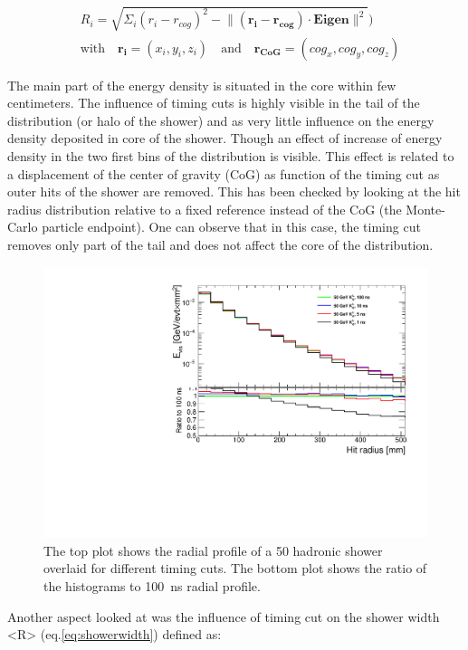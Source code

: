 \begin{equation} \label{eq:radialprof}
  \begin{split}
    & R_{i} = \sqrt{\Sigma_{i} (r_{i} - r_{cog})^{2} - \lVert (\mathbf{r_{i}} - \mathbf{r_{cog}}) \cdot \mathbf{Eigen} \rVert^{2}}) \\
    & \text{with} \quad \mathbf{r_{i}} = (x_i, y_i, z_i) \quad \text{and} \quad \mathbf{r_{CoG}} = (cog_x, cog_y, cog_z)
  \end{split}
\end{equation}

The main part of the energy density is situated in the core within few centimeters. The influence of timing cuts is highly visible in the tail of the distribution (or halo of the shower) and as very little influence on the energy density deposited in core of the shower. Though an effect of increase of energy density in the two first bins of the distribution is visible. This effect is related to a displacement of the center of gravity (CoG) as function of the timing cut as outer hits of the shower are removed. This has been checked by looking at the hit radius distribution relative to a fixed reference instead of the CoG (the Monte-Carlo particle endpoint). One can observe that in this case, the timing cut removes only part of the tail and does not affect the core of the distribution.

\begin{figure}[htbp!]
  \centering
  \includegraphics[width=0.7\linewidth]{../Thesis_Plots/ILD/NoSmearing/Plots/RadialProfileOverlay_noSmearing}
  \caption{The top plot shows the radial profile of a 50 \GeV hadronic shower overlaid for different timing cuts. The bottom plot shows the ratio of the histograms to \SI{100}{\nano\second} radial profile.} \label{fig:RadialProfNoSmearing}
\end{figure}

Another aspect looked at was the influence of timing cut on the shower width <R> (eq.\ref{eq:showerwidth}) defined as:

